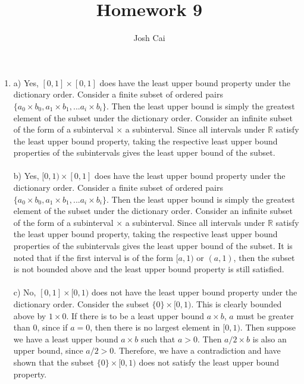 \documentclass{article}
\begin{document}
\title{Homework 9}
\author{Josh Cai}

\maketitle


\begin{enumerate}
\item
a) Yes, $[0,1] \times [0,1]$ does have the least upper bound property under the dictionary order. Consider a finite subset of ordered pairs $\{ a_0\times b_0, a_1 \times b_1, ... a_i \times b_i \}$. Then the least upper bound is simply the greatest element of the subset under the dictionary order. Consider an infinite subset of the form of a subinterval $\times$ a subinterval. Since all intervals under $\mathbb{R}$ satisfy the least upper bound property, taking the respective least upper bound properties of the subintervals gives the least upper bound of the subset.
\\\\b) Yes, $[0,1) \times [0,1]$ does have the least upper bound property under the dictionary order. Consider a finite subset of ordered pairs $\{ a_0\times b_0, a_1 \times b_1, ... a_i \times b_i \}$. Then the least upper bound is simply the greatest element of the subset under the dictionary order. Consider an infinite subset of the form of a subinterval $\times$ a subinterval. Since all intervals under $\mathbb{R}$ satisfy the least upper bound property, taking the respective least upper bound properties of the subintervals gives the least upper bound of the subset. It is noted that if the first interval is of the form $[a,1)$ or $(a,1)$, then the subset is not bounded above and the least upper bound property is still satisfied.
\\\\c) No, $[0,1] \times [0,1)$ does not have the least upper bound property under the dictionary order. Consider the subset $\{0\}\times [0,1)$. This is clearly bounded above by $1\times 0$. If there is to be a least upper bound $a \times b$, $a$ must be greater than 0, since if $a=0$, then there is no largest element in $[0,1)$. Then suppose we have a least upper bound $a \times b$ such that $a>0$. Then $a/2 \times b$ is also an upper bound, since $a/2 > 0$. Therefore, we have a contradiction and have shown that the subset $\{0\}\times [0,1)$ does not satisfy the least upper bound property.

\end{enumerate}
\end{document}
